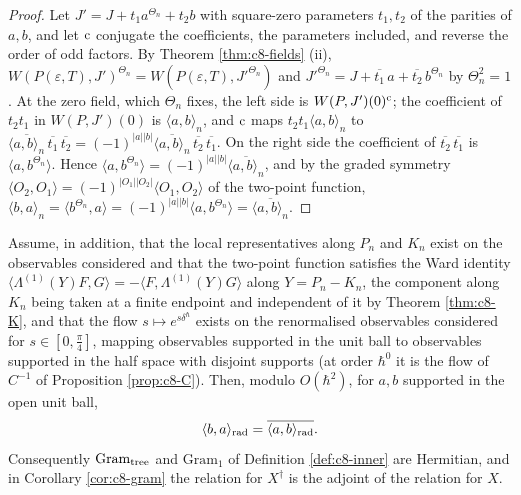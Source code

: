 \begin{proof}
Let $J'=J+t_1a^{\Theta_n}+t_2b$ with square-zero parameters $t_1,t_2$ of the parities of $a,b$, and let ${\rm c}$ conjugate the coefficients, the parameters included, and reverse the order of odd factors. By Theorem \ref{thm:c8-fields} (ii), $W(P(\varepsilon,T),J')^{\Theta_n}=W(P(\varepsilon,T),J'^{\Theta_n})$ and $J'^{\Theta_n}=J+\overline{t_1}\,a+\overline{t_2}\,b^{\Theta_n}$ by $\Theta_n^2=1$. At the zero field, which $\Theta_n$ fixes, the left side is $W(P,J')(0)^{\rm c}$; the coefficient of $t_2t_1$ in $W(P,J')(0)$ is $\langle a,b\rangle_n$, and ${\rm c}$ maps $t_2t_1\langle a,b\rangle_n$ to $\overline{\langle a,b\rangle_n}\,\overline{t_1}\,\overline{t_2}=(-1)^{|a||b|}\overline{\langle a,b\rangle_n}\,\overline{t_2}\,\overline{t_1}$. On the right side the coefficient of $\overline{t_2}\,\overline{t_1}$ is $\langle a,b^{\Theta_n}\rangle$. Hence $\langle a,b^{\Theta_n}\rangle=(-1)^{|a||b|}\overline{\langle a,b\rangle_n}$, and by the graded symmetry $\langle O_2,O_1\rangle=(-1)^{|O_1||O_2|}\langle O_1,O_2\rangle$ of the two-point function, $\langle b,a\rangle_n=\langle b^{\Theta_n},a\rangle=(-1)^{|a||b|}\langle a,b^{\Theta_n}\rangle=\overline{\langle a,b\rangle_n}$.
\end{proof}

\begin{theorem}
\label{thm:c20-hermrad}
Assume, in addition, that the local representatives along $P_n$ and $K_n$ exist on the observables considered and that the two-point function satisfies the Ward identity $\langle\Lambda^{(1)}(Y)F,G\rangle=-\langle F,\Lambda^{(1)}(Y)G\rangle$ along $Y=P_n-K_n$, the component along $K_n$ being taken at a finite endpoint and independent of it by Theorem \ref{thm:c8-K}, and that the flow $s\mapsto e^{s\delta^\hbar}$ exists on the renormalised observables considered for $s\in[0,\tfrac\pi4]$, mapping observables supported in the unit ball to observables supported in the half space with disjoint supports (at order $\hbar^0$ it is the flow of $C^{-1}$ of Proposition \ref{prop:c8-C}). Then, modulo $O(\hbar^2)$, for $a,b$ supported in the open unit ball,
\[
\langle b,a\rangle_{\rm rad}=\overline{\langle a,b\rangle_{\rm rad}} .
\]
Consequently $\mathrm{Gram}_{\rm tree}$ and $\mathrm{Gram}_1$ of Definition \ref{def:c8-inner} are Hermitian, and in Corollary \ref{cor:c8-gram} the relation for $X^\dagger$ is the adjoint of the relation for $X$.
\end{theorem}

